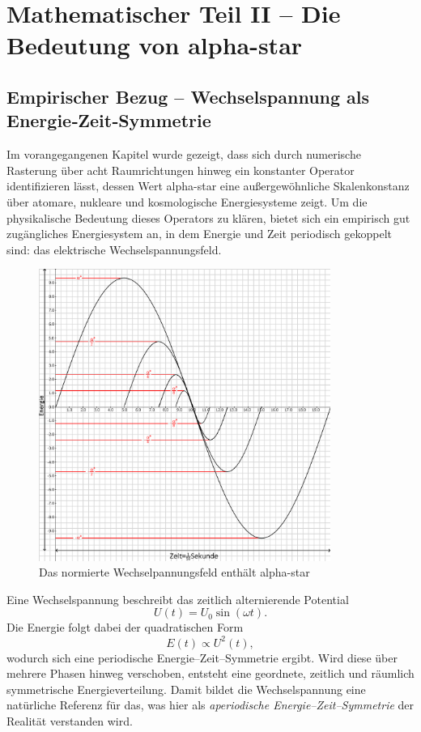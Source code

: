 \chapter{Mathematischer Teil II – Die Bedeutung von \gls{alpha-star}}
\label{chap:mathematischer_rahmen_II}

\section{Empirischer Bezug – Wechselspannung als Energie‐Zeit‐Symmetrie}

Im vorangegangenen Kapitel wurde gezeigt, dass sich durch numerische Rasterung
über acht Raumrichtungen hinweg ein konstanter Operator identifizieren lässt,
dessen Wert \gls{alpha-star} eine außergewöhnliche Skalenkonstanz über atomare,
nukleare und kosmologische Energiesysteme zeigt.
Um die physikalische Bedeutung dieses Operators zu klären,
bietet sich ein empirisch gut zugängliches Energiesystem an,
in dem Energie und Zeit periodisch gekoppelt sind:
das elektrische Wechselspannungsfeld.

\begin{figure}
  \centering
  \includegraphics[width=0.85\textwidth]{Grafiken/Wechselspannung.jpg}
  \caption{Das normierte Wechselpannungsfeld enthält \gls{alpha-star}}
  \label{Diagramm1}
\end{figure}

Eine Wechselspannung beschreibt das zeitlich alternierende Potential
\[
U(t) = U_0 \sin(\omega t).
\]
Die Energie folgt dabei der quadratischen Form
\[
E(t) \propto U^2(t),
\]
wodurch sich eine periodische Energie–Zeit–Symmetrie ergibt.
Wird diese über mehrere Phasen hinweg verschoben,
entsteht eine geordnete, zeitlich und räumlich
symmetrische Energieverteilung.
Damit bildet die Wechselspannung eine natürliche Referenz
für das, was hier als \emph{aperiodische Energie–Zeit–Symmetrie}
der Realität verstanden wird.

